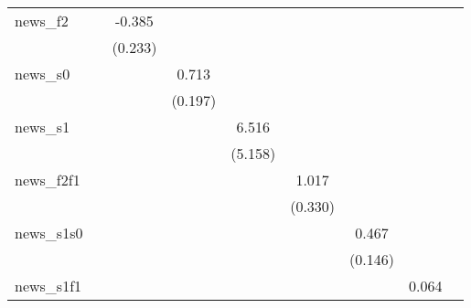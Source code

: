 {\begin{tabular}{l*{8}{c}}
\addlinespace
news\_f2     &                     &      -0.385\sym{*}  &                     &                     &                     &                     &                     &                     \\
            &                     &     (0.233)         &                     &                     &                     &                     &                     &                     \\
\addlinespace
news\_s0     &                     &                     &       0.713\sym{***}&                     &                     &                     &                     &                     \\
            &                     &                     &     (0.197)         &                     &                     &                     &                     &                     \\
\addlinespace
news\_s1     &                     &                     &                     &       6.516         &                     &                     &                     &                     \\
            &                     &                     &                     &     (5.158)         &                     &                     &                     &                     \\
\addlinespace
news\_f2f1   &                     &                     &                     &                     &       1.017\sym{***}&                     &                     &                     \\
            &                     &                     &                     &                     &     (0.330)         &                     &                     &                     \\
\addlinespace
news\_s1s0   &                     &                     &                     &                     &                     &       0.467\sym{***}&                     &                     \\
            &                     &                     &                     &                     &                     &     (0.146)         &                     &                     \\
\addlinespace
news\_s1f1   &                     &                     &                     &                     &                     &                     &       0.064         &                     \\

\end{tabular}}
